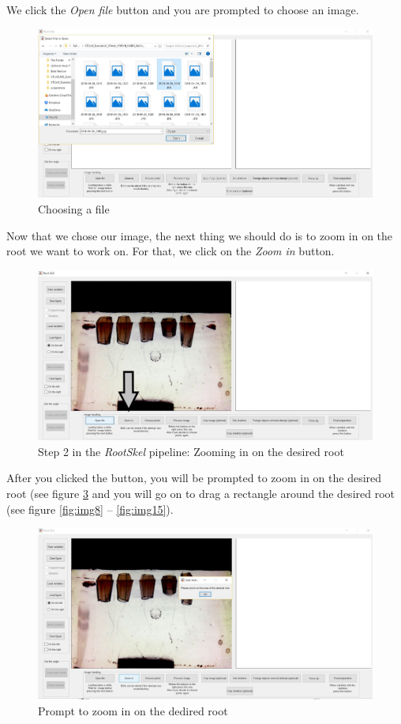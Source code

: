  We click the \textit{Open file} button and you are prompted to choose an image.
 \begin{figure}[H]
 	\centering
 	\includegraphics[width=\textwidth]{../Figures/manual/step2.jpg}
 	\caption{Choosing a file}
 	\label{fig:img5}
 \end{figure}
 
 Now that we chose our image, the next thing we should do is to zoom in on the root we want to work on. 
 For that, we click on the \textit{Zoom in} button.
 \begin{figure}[H]
 	\centering
 	\includegraphics[width=\textwidth]{../Figures/manual/step3.jpg}
 	\caption{Step 2 in the \textit{RootSkel} pipeline: Zooming in on the desired root}
 	\label{fig:img6}
 \end{figure}
 
 After you clicked the button, you will be prompted to zoom in on the desired root (see figure \ref{fig:img7}
 and you will go on to drag a rectangle around the desired root (see figure \ref{fig:img8} -- \ref{fig:img15}).
 	
\begin{figure}[H]
 	\centering
 	\includegraphics[width=\textwidth]{../Figures/manual/step4.jpg}
 	\caption{Prompt to zoom in on the dedired root}
 	\label{fig:img7}
\end{figure} 	
 
